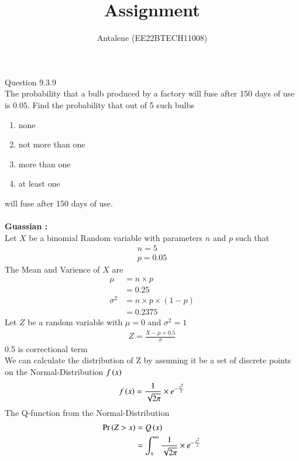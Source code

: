 \documentclass[article]{IEEEtran}
\theoremstyle{remark}
\begin{document}
\let\vec\mathbf


\title{
Assignment
}
\author{ Antalene (EE22BTECH11008)}
\maketitle

\vspace{3cm}
Question 9.3.9\\
The probability that a bulb produced by a factory will fuse after 150 days of use
is $0.05$. Find the probability that out of 5 such bulbs
\begin{enumerate}
\item  none
\item not more than one
\item more than one
\item at least one
\end{enumerate}
will fuse after 150 days of use.
\\
\solution\\
\textbf{Guassian :}\\
Let $X$ be a binomial Random variable with parameters $n$ and $p$ such that
\begin{align}
	n = 5\\
	p = 0.05
\end{align}
The Mean and Varience of $X$ are
\begin{align}
	\mu &= n \times p\\
	&= 0.25\\
	\sigma^2 &= n\times p \times (1-p)\\
	&= 0.2375
\end{align}
Let $Z$ be a random variable with $\mu = 0$ and $\sigma^2 = 1$
\begin{align}
	Z = \frac{X - \mu + 0.5}{\sigma}
\end{align}
0.5 is correctional term\\
We can calculate the distribution of Z by assuming it be a set of discrete points on the
Normal-Distribution $f\left(x\right)$
\begin{align}
	f\left(x\right) = \frac{1}{\sqrt{2\pi}} \times e^{-\frac{x^2}{2}}\\
\end{align}
The Q-function from the Normal-Distribution
\begin{align}
	\Pr\left(Z>x\right) &= Q\left(x\right)\\
	&= \int_{x}^{\infty} \frac{1}{\sqrt{2\pi}} \times e^{-\frac{x^2}{2}}
\end{align}
\end{document}
